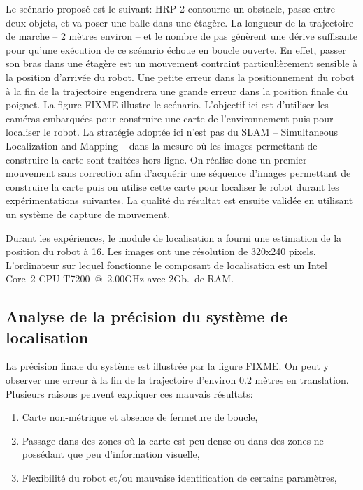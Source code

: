 Le scénario proposé est le suivant: HRP-2 contourne un obstacle, passe
entre deux objets, et va poser une balle dans une étagère. La longueur
de la trajectoire de marche -- 2 mètres environ -- et le nombre de pas
génèrent une dérive suffisante pour qu'une exécution de ce scénario
échoue en boucle ouverte. En effet, passer son bras dans une étagère
est un mouvement contraint particulièrement sensible à la position
d'arrivée du robot. Une petite erreur dans la positionnement du robot
à la fin de la trajectoire engendrera une grande erreur dans la
position finale du poignet. La figure FIXME illustre le scénario.
L'objectif ici est d'utiliser les caméras embarquées pour construire
une carte de l'environnement puis pour localiser le robot. La
stratégie adoptée ici n'est pas du SLAM -- Simultaneous Localization
and Mapping -- dans la mesure où les images permettant de construire
la carte sont traitées hors-ligne. On réalise donc un premier
mouvement sans correction afin d'acquérir une séquence d'images
permettant de construire la carte puis on utilise cette carte pour
localiser le robot durant les expérimentations suivantes. La qualité
du résultat est ensuite validée en utilisant un système de capture de
mouvement.


Durant les expériences, le module de localisation a fourni une
estimation de la position du robot à 16\hertz. Les images ont une
résolution de 320x240 pixels. L'ordinateur sur lequel fonctionne le
composant de localisation est un Intel\textregistered
Core\texttrademark\ 2 CPU T7200~@~2.00GHz avec 2Gb.\ de RAM.


\subsection{Analyse de la précision du système de localisation}

La précision finale du système est illustrée par la figure FIXME. On
peut y observer une erreur à la fin de la trajectoire d'environ 0.2
mètres en translation. Plusieurs raisons peuvent expliquer ces mauvais résultats:
\begin{enumerate}
\item Carte non-métrique et absence de fermeture de boucle,
\item Passage dans des zones où la carte est peu dense ou dans des
  zones ne possédant que peu d'information visuelle,
\item Flexibilité du robot et/ou mauvaise identification de certains paramètres,
\end{enumerate}


